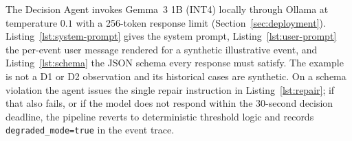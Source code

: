 
The Decision Agent invokes Gemma~3 1B (INT4) locally through Ollama at
temperature $0.1$ with a 256-token response limit (Section~\ref{sec:deployment}).
Listing~\ref{lst:system-prompt} gives the system prompt, Listing~\ref{lst:user-prompt}
the per-event user message rendered for a synthetic illustrative event, and
Listing~\ref{lst:schema} the JSON schema every response must satisfy. The
example is not a D1 or D2 observation and its historical cases are synthetic. On a
schema violation the agent issues the single repair instruction in
Listing~\ref{lst:repair}; if that also fails, or if the model does not respond
within the 30-second decision deadline, the pipeline reverts to deterministic
threshold logic and records \texttt{degraded\_mode=true} in the event trace.

